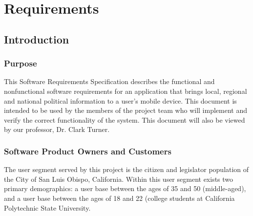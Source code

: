 \section{Requirements}
\subsection{Introduction}
\subsubsection{Purpose}
This Software Requirements Specification describes the functional and
nonfunctional software requirements for an application that brings
local, regional and national political information to a user's mobile
device.  This document is intended to be used by the members of the
project team who will implement and verify the correct functionality
of the system. This document will also be viewed by our professor,
Dr. Clark Turner.

\subsubsection{Software Product Owners and Customers}
The user segment served by this project is the citizen and legislator population of
the City of San Luis Obispo, California. Within this user segment
exists two primary demographics: a user base between the ages of 35 and 50
(middle-aged), and a user base between the ages of 18 and 22 (college students
at California Polytechnic State University.


